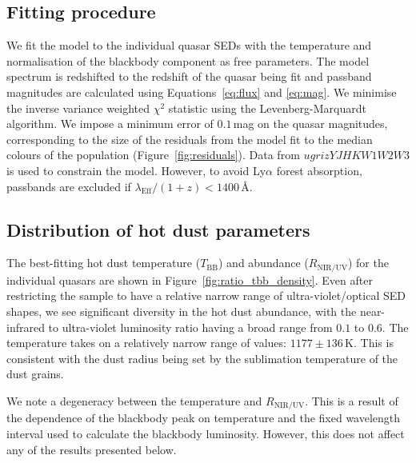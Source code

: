 \subsection{Fitting procedure}

We fit the model to the individual quasar SEDs with the temperature and normalisation of the blackbody component as free parameters. 
The model spectrum is redshifted to the redshift of the quasar being fit and passband magnitudes are calculated using Equations~\ref{eq:flux} and \ref{eq:mag}.   
We minimise the inverse variance weighted $\chi^2$ statistic using the Levenberg-Marquardt algorithm. 
We impose a minimum error of $0.1$\,mag on the quasar magnitudes, corresponding to the size of the residuals from the model fit to the median colours of the population (Figure~\ref{fig:residuals}). 
Data from $ugrizYJHKW1W2W3$ is used to constrain the model. 
However, to avoid Ly$\alpha$ forest absorption, passbands are excluded if $\lambda_{\text{Eff}} / (1 + z) < 1400$\,\AA.   

\subsection{Distribution of hot dust parameters}

The best-fitting hot dust temperature ($T_{\text{BB}}$) and abundance ($R_{\text{NIR/UV}}$) for the individual quasars are shown in Figure~\ref{fig:ratio_tbb_density}.
Even after restricting the sample to have a relative narrow range of ultra-violet/optical SED shapes, we see significant diversity in the hot dust abundance, with the near-infrared to ultra-violet luminosity ratio having a broad range from $0.1$ to $0.6$.
The temperature takes on a relatively narrow range of values: $1177\pm136$\,K. 
This is consistent with the dust radius being set by the sublimation temperature of the dust grains. 

We note a degeneracy between the temperature and $R_{\text{NIR/UV}}$. 
This is a result of the dependence of the blackbody peak on temperature and the fixed wavelength interval used to calculate the blackbody luminosity. 
However, this does not affect any of the results presented below. 

